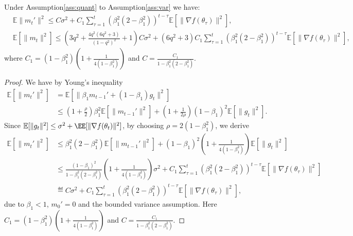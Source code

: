 \documentclass[11pt]{article}
\begin{document}
\begin{Lemma} \label{lemma:m_t,m_t'}
Under Assumption\ref{ass:quant} to Assumption\ref{ass:var} we have:
\begin{align*}
    &\mathbb E\|m_t'\|^2\leq C\sigma^2+C_1 \sum_{\tau=1}^t (\beta_1^2(2-\beta_1^2))^{t-\tau}\mathbb E[\|\nabla f(\theta_\tau)\|^2],\\
    &\mathbb E[\|m_t\|^2]\leq (3q^2+\frac{4q^2(6q^2+3)}{(1-q^2)^2}+1)C\sigma^2+(6q^2+3)C_1\sum_{\tau=1}^t (\beta_1^2(2-\beta_1^2))^{t-\tau}\mathbb E[\|\nabla f(\theta_\tau)\|^2],
\end{align*}
where $C_1=(1-\beta_1^2)(1+\frac{1}{4(1-\beta_1^2)})$ and $C=\frac{C_1}{1-\beta_1^2(2-\beta_1^2)}$.
\end{Lemma}

\begin{proof}
We have by Young's inequality
\begin{align*}
    \mathbb E[\|m_t'\|^2]&=\mathbb E[\|\beta_1m_{t-1}'+(1-\beta_1)g_t\|^2]\\
    &\leq (1+\frac{\rho}{2})\beta_1^2 \mathbb E[\|m_{t-1}'\|^2]+(1+\frac{1}{2\rho})(1-\beta_1)^2 \mathbb E[\|g_t\|^2].
\end{align*}
Since $\mathbb E[\|g_t\|^2]\leq \sigma^2+ \EE[\|\nabla f(\theta_t)\|^2]$, by choosing $\rho=2(1-\beta_1^2)$, we derive
\begin{align}
    \mathbb E[\|m_t'\|^2]&\leq \beta_1^2(2-\beta_1^2)\mathbb E[\|m_{t-1}'\|^2]+(1-\beta_1)^2(1+\frac{1}{4(1-\beta_1^2)})\mathbb E[\|g_t\|^2]\\
    &\leq \frac{(1-\beta_1)^2}{1-\beta_1^2(2-\beta_1^2)}(1+\frac{1}{4(1-\beta_1^2)})\sigma^2+C_1 \sum_{\tau=1}^t (\beta_1^2(2-\beta_1^2))^{t-\tau}\mathbb E[\|\nabla f(\theta_\tau)\|^2]\\
    &\eqdef C\sigma^2+C_1 \sum_{\tau=1}^t (\beta_1^2(2-\beta_1^2))^{t-\tau}\mathbb E[\|\nabla f(\theta_\tau)\|^2],
\end{align}
due to $\beta_1<1$, $m_0'=0$ and the bounded variance assumption. Here $C_1=(1-\beta_1^2)(1+\frac{1}{4(1-\beta_1^2)})$ and $C=\frac{C_1}{1-\beta_1^2(2-\beta_1^2)}$.


\end{proof}
\end{document}
